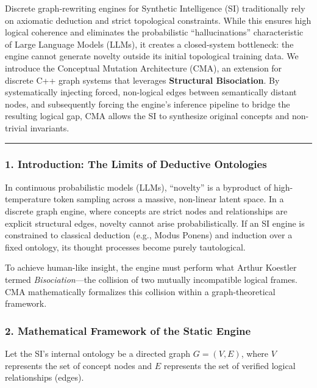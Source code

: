 \documentclass[
  11pt,
  a4paper,
]{article}
\begin{document}
Discrete graph-rewriting engines for Synthetic Intelligence (SI)
traditionally rely on axiomatic deduction and strict topological
constraints. While this ensures high logical coherence and eliminates
the probabilistic ``hallucinations'' characteristic of Large Language
Models (LLMs), it creates a closed-system bottleneck: the engine cannot
generate novelty outside its initial topological training data. We
introduce the Conceptual Mutation Architecture (CMA), an extension for
discrete C++ graph systems that leverages \textbf{Structural
Bisociation}. By systematically injecting forced, non-logical edges
between semantically distant nodes, and subsequently forcing the
engine's inference pipeline to bridge the resulting logical gap, CMA
allows the SI to synthesize original concepts and non-trivial
invariants.

\begin{center}\rule{0.5\linewidth}{0.5pt}\end{center}

\subsubsection{1. Introduction: The Limits of Deductive
Ontologies}\label{introduction-the-limits-of-deductive-ontologies}

In continuous probabilistic models (LLMs), ``novelty'' is a byproduct of
high-temperature token sampling across a massive, non-linear latent
space. In a discrete graph engine, where concepts are strict nodes and
relationships are explicit structural edges, novelty cannot arise
probabilistically. If an SI engine is constrained to classical deduction
(e.g., Modus Ponens) and induction over a fixed ontology, its thought
processes become purely tautological.

To achieve human-like insight, the engine must perform what Arthur
Koestler termed \emph{Bisociation}---the collision of two mutually
incompatible logical frames. CMA mathematically formalizes this
collision within a graph-theoretical framework.

\subsubsection{2. Mathematical Framework of the Static
Engine}\label{mathematical-framework-of-the-static-engine}

Let the SI's internal ontology be a directed graph \(G = (V, E)\), where
\(V\) represents the set of concept nodes and \(E\) represents the set
of verified logical relationships (edges).
\end{document}
